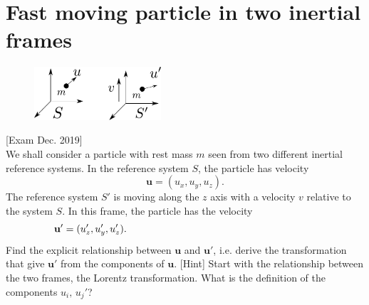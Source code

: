 \documentclass{article}
\begin{document}
    \section{Fast moving particle in two inertial frames}
    \begin{figure}
        \includegraphics[width=0.42\textwidth]{figures/figure_2.pdf}
    \end{figure}
    [Exam Dec. 2019] \\
    We shall consider a particle with rest mass $m$ seen from two different inertial reference systems. In the reference system $S$, the particle has velocity
    \begin{equation*}
        \mathbf{u} = (u_x, u_y, u_z).
    \end{equation*} 
    The reference system $S'$ is moving along the $z$ axis with a velocity $v$ relative to the system $S$. In this frame, the particle has the velocity
    \begin{equation*}
        \mathbf{u'} = (u'_z, u'_y, u'_z). \hspace{6.7cm} %
    \end{equation*}
    Find the explicit relationship between $\mathbf{u}$ and $\mathbf{u'}$, i.e. derive the transformation that give $\mathbf{u'}$ from the components of $\mathbf{u}$. [Hint] Start with the relationship between the two frames, the Lorentz transformation. What is the definition of the components $u_i, \, u_j'$?
\end{document}
